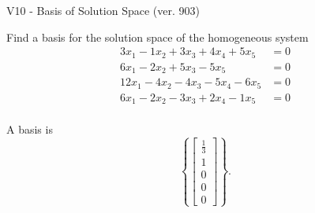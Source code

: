 \begin{exercise}
  \begin{exerciseTitle}V10 - Basis of Solution Space (ver. 903)\end{exerciseTitle}
  \begin{exerciseStatement}
    Find a basis for the solution space of the homogeneous system 
\begin{align*}
 3 x_ 1 -1 x_ 2 + 3 x_ 3 + 4 x_ 4 + 5 x_ 5 &= 0  \\ 
  6 x_ 1 -2 x_ 2 + 5 x_ 3 -5 x_ 5 &= 0  \\ 
  12 x_ 1 -4 x_ 2 -4 x_ 3 -5 x_ 4 -6 x_ 5 &= 0  \\ 
  6 x_ 1 -2 x_ 2 -3 x_ 3 + 2 x_ 4 -1 x_ 5 &= 0  \\ 
 \end{align*}


 
  \end{exerciseStatement}

  \begin{exerciseAnswer}
   A basis is   
\[\left\{\left[\begin{array}{c}
\frac{1}{3} \\
1 \\
0 \\
0 \\
0
\end{array}\right]\right\}.\]

  


  \end{exerciseAnswer}
\end{exercise}